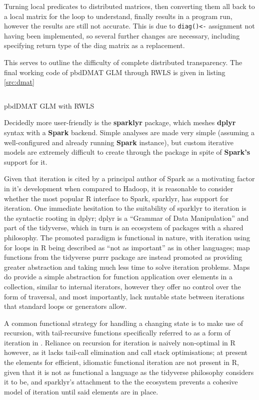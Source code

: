 \documentclass[a4paper,10pt]{article}
\begin{document}
Turning local predicates to distributed matrices, then converting them all back to a local matrix for the loop to understand, finally results in a program run, however the results are still not accurate.  
This is due to \texttt{diag()<-} assignment not having been implemented, so several further changes are necessary, including specifying return type of the diag matrix as a replacement.

This serves to outline the difficulty of complete distributed transparency. 
The final working code of pbdDMAT GLM through RWLS is given in listing \ref{src:dmat}

\begin{listing}
\inputminted{r}{R/review-pbdr.R}
        \caption{pbdDMAT GLM with RWLS}
        \label{src:dmat}
\end{listing}

Decidedly more user-friendly is the \textbf{sparklyr} package, which meshes \textbf{dplyr} syntax with a \textbf{Spark} backend.
Simple analyses are made very simple (assuming a well-configured and already running \textbf{Spark} instance), but custom iterative models are extremely difficult to create through the package in spite of \textbf{Spark's} support for it. 

Given that iteration is cited by a principal author of Spark as a motivating factor in it's development when compared to Hadoop, it is reasonable to consider whether the most popular R interface to Spark, sparklyr, has support for iteration\cite{zaharia2010spark}\cite{luraschi20}.
One immediate hesitation to the suitability of sparklyr to iteration is the syntactic rooting in dplyr; dplyr is a ``Grammar of Data Manipulation'' and part of the tidyverse, which in turn is an ecosystem of packages with a shared philosophy\cite{wickham2019welcome}\cite{wickham2016r}.
The promoted paradigm is functional in nature, with iteration using for loops in R being described as ``not as important'' as in other languages; map functions from the tidyverse purrr package are instead promoted as providing greater abstraction and taking much less time to solve iteration problems.
Maps do provide a simple abstraction for function application over elements in a collection, similar to internal iterators, however they offer no control over the form of traversal, and most importantly, lack mutable state between iterations that standard loops or generators allow\cite{cousineau1998functional}.

A common functional strategy for handling a changing state is to make use of recursion, with tail-recursive functions specifically referred to as a form of iteration in \citeauthor{abelson1996structure}.
Reliance on recursion for iteration is naively non-optimal in R however, as it lacks tail-call elimination and call stack optimisations\cite{rcore2020lang}; at present the elements for efficient, idiomatic functional iteration are not present in R, given that it is not as functional a language as the tidyverse philosophy considers it to be, and sparklyr's attachment to the the ecosystem prevents a cohesive model of iteration until said elements are in place.
\end{document}

